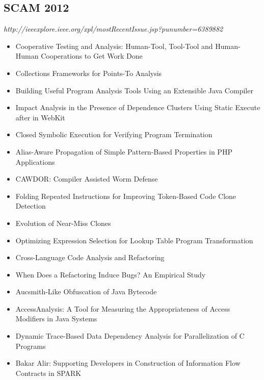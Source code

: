 \subsection{SCAM 2012}

{\small \em http://ieeexplore.ieee.org/xpl/mostRecentIssue.jsp?punumber=6389882}

{\small
\begin{itemize}[itemsep=-1ex]
  \item Cooperative Testing and Analysis: Human-Tool, Tool-Tool and Human-Human Cooperations to Get Work Done
  \item Collections Frameworks for Points-To Analysis {\color{blue} \checkmark}{\color{red} \texttimes}
  \item Building Useful Program Analysis Tools Using an Extensible Java Compiler {\color{blue} \checkmark}{\color{blue} \checkmark}
  \item Impact Analysis in the Presence of Dependence Clusters Using Static Execute after in WebKit {\color{blue} \checkmark}{\color{red} \texttimes}
  \item Closed Symbolic Execution for Verifying Program Termination
  \item Alias-Aware Propagation of Simple Pattern-Based Properties in PHP Applications {\color{blue} \checkmark}{\color{red} \texttimes}
  \item CAWDOR: Compiler Assisted Worm Defense {\color{blue} \checkmark}{\color{red} \texttimes}
  \item Folding Repeated Instructions for Improving Token-Based Code Clone Detection
  \item Evolution of Near-Miss Clones
  \item Optimizing Expression Selection for Lookup Table Program Transformation
  \item Cross-Language Code Analysis and Refactoring {\color{blue} \checkmark}{\color{red} \texttimes}
  \item When Does a Refactoring Induce Bugs? An Empirical Study {\color{blue} \checkmark}{\color{red} \texttimes}
  \item Aucsmith-Like Obfuscation of Java Bytecode
  \item AccessAnalysis: A Tool for Measuring the Appropriateness of Access Modifiers in Java Systems {\color{blue} \checkmark}{\color{blue} \checkmark}
  \item Dynamic Trace-Based Data Dependency Analysis for Parallelization of C Programs
  \item Bakar Alir: Supporting Developers in Construction of Information Flow Contracts in SPARK {\color{blue} \checkmark}{\color{red} \texttimes}

\end{itemize}}
